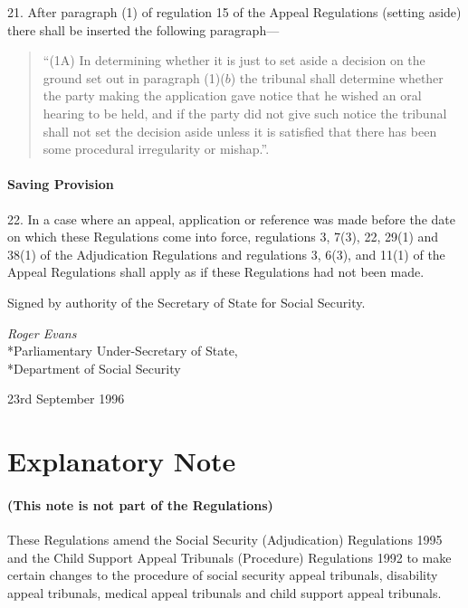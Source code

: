 \documentclass[12pt,a4paper]{article}
\begin{document}
21.  After paragraph (1) of regulation 15 of the Appeal Regulations (setting aside) there shall be inserted the following paragraph—
\begin{quotation}
“(1A) In determining whether it is just to set aside a decision on the ground set out in paragraph (1)($b$) the tribunal shall determine whether the party making the application gave notice that he wished an oral hearing to be held, and if the party did not give such notice the tribunal shall not set the decision aside unless it is satisfied that there has been some procedural irregularity or mishap.”.
\end{quotation}

\subsection[22. Saving Provision]{Saving Provision}

22.  In a case where an appeal, application or reference was made before the date on which these Regulations come into force, regulations 3, 7(3), 22, 29(1) and 38(1) of the Adjudication Regulations and regulations 3, 6(3), and 11(1) of the Appeal Regulations shall apply as if these Regulations had not been made.

\bigskip

Signed by authority of the Secretary of State for Social Security.

{\raggedleft
\emph{Roger Evans}\\*Parliamentary Under-Secretary of State,\\*Department of Social Security

}

23rd September 1996

\small

\part{Explanatory Note}

\renewcommand\parthead{--- Explanatory Note}

\subsection*{(This note is not part of the Regulations)}

These Regulations amend the Social Security (Adjudication) Regulations 1995 and the Child Support Appeal Tribunals (Procedure) Regulations 1992 to make certain changes to the procedure of social security appeal tribunals, disability appeal tribunals, medical appeal tribunals and child support appeal tribunals.
\end{document}
